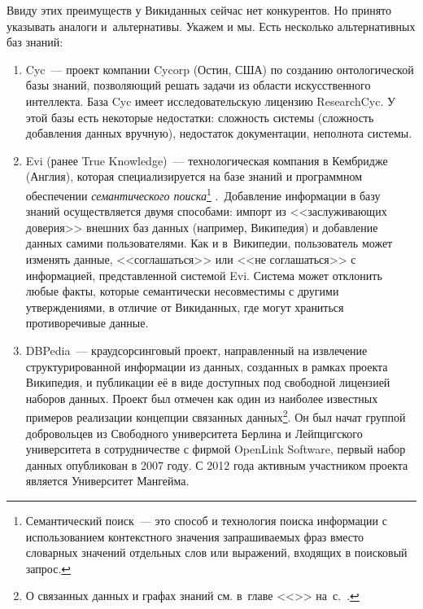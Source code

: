 Ввиду этих преимуществ у Викиданных сейчас нет конкурентов. 
Но принято указывать аналоги и~альтернативы. Укажем и мы. Есть несколько альтернативных баз знаний:
\begin{enumerate}
\item Cyc~--- проект компании Cycorp (Остин, США) по созданию онтологической базы знаний, 
    позволяющий решать задачи из области искусственного интеллекта. База Cyc имеет исследовательскую лицензию ResearchCyc. У этой базы есть некоторые недостатки: сложность системы (сложность добавления данных
вручную), недостаток документации, неполнота системы.
\item Evi (ранее True Knowledge)~--- 
    технологическая компания в Кембридже (Англия), 
        которая специализируется на базе знаний и программном обеспечении 
        \textit{семантического поиска}\footnote[][1\baselineskip]{%
            Семантический поиск~--- 
            это способ и технология поиска информации с использованием контекстного значения запрашиваемых фраз 
            вместо словарных значений отдельных слов или выражений, входящих в поисковый запрос.}%
.\,     Добавление информации в базу знаний осуществляется двумя способами: импорт из <<заслуживающих доверия>> внешних баз данных (например, Википедия) и добавление данных самими пользователями. Как и в~Википедии, пользователь может изменять
данные, <<соглашаться>> или <<не соглашаться>> с информацией, представленной системой Evi. Система может отклонить любые факты, которые семантически несовместимы с другими утверждениями, в отличие от Викиданных, где могут
храниться противоречивые данные.
\item DBPedia~--- краудсорсинговый проект, 
    направленный на извлечение структурированной информации из данных, 
        созданных в рамках проекта Википедия, 
        и публикации её в виде доступных под свободной лицензией наборов данных. 
        Проект был отмечен как один из наиболее известных примеров реализации 
        концепции связанных данных\footnote[][]{%
%
О связанных данных и графах знаний см. в~главе <<>> на~с.~\pageref{ch:BucketsAndBalls}.%
%
}.      Он был начат группой добровольцев из Свободного университета Берлина и Лейпцигского университета 
        в сотрудничестве с фирмой OpenLink Software, первый набор данных опубликован в 2007 году. 
        С 2012 года активным участником проекта является Университет Мангейма.%
\end{enumerate}

